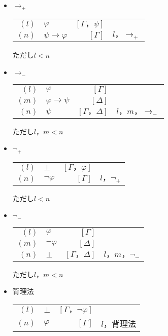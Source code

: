 \documentclass[10pt,b5paper,papersize,dvipdfmx]{jsbook}
\begin{document}
\begin{itemize}
\begin{itemize}
\item $\to_+$
\begin{table}[H]
\begin{center}
\begin{tabular}{rlrl}
$(l)$&$\varphi$&$[\Gamma，\psi]$& \\
$(n)$&$\psi \to \varphi$&$[\Gamma]$&$l，\to_+$ \\
\end{tabular}
\end{center}
\end{table}
ただし$l<n$
\item $\to_-$
\begin{table}[H]
\begin{center}
\begin{tabular}{rlrl}
$(l)$&$\varphi$&$[\Gamma]$& \\
$(m)$&$\varphi \to \psi$&$[\Delta]$& \\
$(n)$&$\psi$&$[\Gamma，\Delta]$&$l，m，\to_-$
\end{tabular}
\end{center}
\end{table}
ただし$l，m<n$
\item $\lnot_+$
\begin{table}[H]
\begin{center}
\begin{tabular}{rlrl}
$(l)$&$\bot$&$[\Gamma，\varphi]$& \\
$(n)$&$\lnot \varphi$&$[\Gamma]$&$l，\lnot_+$
\end{tabular}
\end{center}
\end{table}
ただし$l<n$
\item $\lnot_-$
\begin{table}[H]
\begin{center}
\begin{tabular}{rlrl}
$(l)$&$\varphi$&$[\Gamma]$& \\
$(m)$&$\lnot \varphi$&$[\Delta]$& \\
$(n)$&$\bot$&$[\Gamma，\Delta]$&$l，m，\lnot_-$
\end{tabular}
\end{center}
\end{table}
ただし$l，m<n$
\item 背理法
\begin{table}[H]
\begin{center}
\begin{tabular}{rlrl}
$(l)$&$\bot$&$[\Gamma，\lnot \varphi]$& \\
$(n)$&$\varphi$&$[\Gamma]$&$l，$背理法

\end{tabular}
\end{center}
\end{table}
\end{itemize}
\end{itemize}
\end{document}
